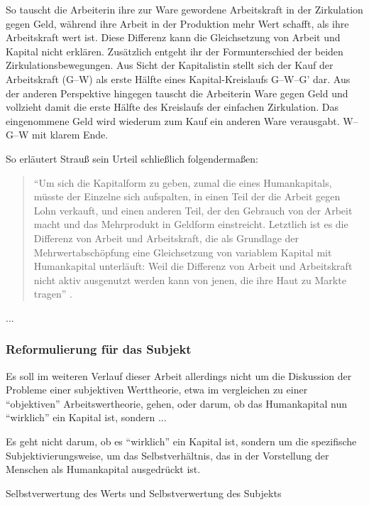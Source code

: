 \documentclass[12pt,
               DIV13,
               paper=a4,
               twoside=false,
               onehalfspacing,
               bibliography=totoc,
               toc=graduated,
               draft,
               ]{scrartcl}
\newcommand{\pc}[2]{\parencite[#1]{#2}}
\newcommand{\gwg}{G--W--G'\xspace}
\newcommand{\wgw}{W--G--W\xspace}
\begin{document}
So tauscht die Arbeiterin ihre zur Ware gewordene Arbeitskraft in der
Zirkulation gegen Geld, während ihre Arbeit in der Produktion mehr
Wert schafft, als ihre Arbeitskraft wert ist. Diese Differenz kann die
Gleichsetzung von Arbeit und Kapital nicht erklären. Zusätzlich
entgeht ihr der Formunterschied der beiden Zirkulationsbewegungen. Aus
Sicht der Kapitalistin stellt sich der Kauf der Arbeitskraft (G--W)
als erste Hälfte eines Kapital-Kreislaufs \gwg dar. Aus der anderen
Perspektive hingegen tauscht die Arbeiterin Ware gegen Geld und
vollzieht damit die erste Hälfte des Kreislaufs der einfachen
Zirkulation. Das eingenommene Geld wird wiederum zum Kauf ein anderen
Ware verausgabt. \wgw mit klarem Ende.

So erläutert Strauß sein Urteil schließlich folgendermaßen:

\begin{spacing}{1}
\begin{quote}
"`Um sich die Kapitalform zu geben, zumal die eines Humankapitals,
müsste der Einzelne sich aufspalten, in einen Teil der die Arbeit
gegen Lohn verkauft, und einen anderen Teil, der den Gebrauch von der
Arbeit macht und das Mehrprodukt in Geldform einstreicht.
Letztlich ist es die Differenz von Arbeit und Arbeitskraft, die als
Grundlage der Mehrwertabschöpfung eine Gleichsetzung von variablem
Kapital mit Humankapital unterläuft: Weil die Differenz von Arbeit und
Arbeitskraft nicht aktiv ausgenutzt werden kann von jenen, die ihre
Haut zu Markte tragen"' \pc{126}{strauss}.
\end{quote}
\end{spacing}

...

\subsubsection{Reformulierung für das Subjekt}

Es soll im weiteren Verlauf dieser Arbeit allerdings nicht um die
Diskussion der Probleme einer subjektiven Werttheorie, etwa im
vergleichen zu einer "`objektiven"' Arbeitswertheorie, gehen, oder
darum, ob das Humankapital nun "`wirklich"' ein Kapital ist, sondern
...

Es geht nicht darum, ob es "`wirklich"' ein Kapital ist, sondern um
die spezifische Subjektivierungsweise, um das Selbstverhältnis, das in
der Vorstellung der Menschen als Humankapital ausgedrückt ist.

Selbstverwertung des Werts und Selbstverwertung des Subjekts
\end{document}

